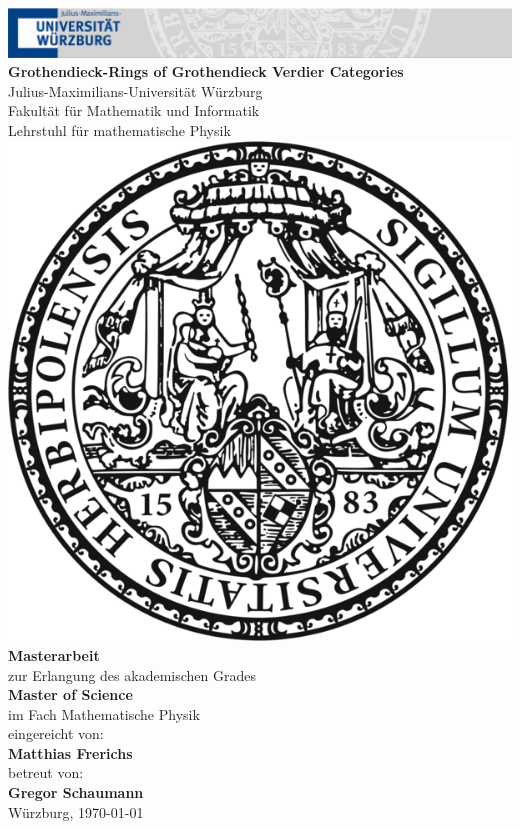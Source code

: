 \documentclass[
oneside
]{scrbook}
\begin{document}
\begin{titlepage}
    {
        \begin{center}
            \thispagestyle{empty}
            \includegraphics[width= \linewidth]{../included_media/Header.png}
            \linebreak
            \vspace{1.5\baselineskip}
            \linebreak
            {\Huge
                \textbf{Grothendieck-Rings of Grothendieck Verdier Categories}\\}
            \vspace{1cm}
            {\Large
                Julius-Maximilians-Universität Würzburg\\
                Fakultät für Mathematik und Informatik\\
                Lehrstuhl für mathematische Physik\\}
            \vspace{1.5\baselineskip}
            \includegraphics[width= .3 \linewidth]{../included_media/siegel.png}
            \vspace{1.5\baselineskip}
            \linebreak
            {\large \normalfont \textbf{Masterarbeit}\\
                zur Erlangung des akademischen Grades\\
                \vspace{1.2\baselineskip}
                \textbf{Master of Science}\\
                im Fach Mathematische Physik\\
                \vspace{1.2\baselineskip}
                eingereicht von:\\
                \textbf{Matthias Frerichs}\\
                \vspace{1.2\baselineskip}
                betreut von:\\
                \textbf{Gregor Schaumann}\\
                \vspace{1.5\baselineskip}
                Würzburg, \today
            }
        \end{center}
    }
\end{titlepage}
\end{document}
